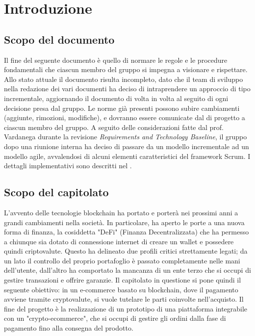 \section{Introduzione} \label{section: introduzione}

\subsection {Scopo del documento}
Il fine del seguente documento è quello di normare le regole e le procedure fondamentali che ciascun membro del gruppo \groupName{} si impegna a visionare e rispettare.
Allo stato attuale il documento risulta incompleto, dato che il team di sviluppo nella redazione dei vari documenti ha deciso di intraprendere un approccio di tipo incrementale, aggiornando il documento di volta in volta al seguito di ogni decisione presa dal gruppo.
Le norme già presenti possono subire cambiamenti (aggiunte, rimozioni, modifiche), e dovranno essere comunicate dal \roleProjectManagerLow{} di progetto a ciascun membro del gruppo.
A seguito delle considerazioni fatte dal prof. Vardanega durante la revisione \textit{Requirements and Technology Baseline}, il gruppo \groupName{} dopo una riunione interna ha deciso di passare da un modello incrementale ad un modello agile, avvalendosi di alcuni elementi caratteristici del framework Scrum\glo{}. I dettagli implementativi sono descritti nel \docNameVersionPdP{}.
\vspace{1cm}

\subsection{Scopo del capitolato}
L'avvento delle tecnologie blockchain\glo{} ha portato e porterà nei prossimi anni a grandi cambiamenti nella società.
In particolare, ha aperto le porte a una nuova forma di finanza, la cosiddetta "DeFi" (Finanza Decentralizzata) che ha permesso a chiunque sia dotato di connessione internet di creare un wallet\glo{} e possedere quindi criptovalute\glo{}.
Questo ha delineato due profili critici strettamente legati; da un lato il controllo del proprio portafoglio è passato completamente nelle mani dell'utente, dall'altro ha comportato la mancanza di un ente terzo che si occupi di gestire transazioni e offrire garanzie.
\newline
Il capitolato in questione si pone quindi il seguente obiettivo: in un e-commerce\glo{} basato su blockchain\glo{}, dove il pagamento avviene tramite cryptovalute\glo{}, si vuole tutelare le parti coinvolte nell'acquisto.
\newline
Il fine del progetto è la realizzazione di un prototipo di una piattaforma integrabile con un "crypto-ecommerce\glo{}", che si occupi di gestire gli ordini dalla fase di pagamento fino alla consegna del prodotto.

